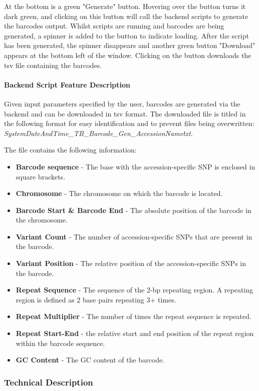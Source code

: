 \documentclass[12pt]{article}
\begin{document}
\begin{itemize}
At the bottom is a green "Generate" button. Hovering over the button turns it dark green, and clicking on this button will call the backend scripts to generate the barcodes output. Whilst scripts are running and barcodes are being generated, a spinner is added to the button to indicate loading. After the script has been generated, the spinner disappears and another green button "Download" appears at the bottom left of the window. Clicking on the button downloads the tsv file containing the barcodes.  

\paragraph{Backend Script Feature Description}
Given input parameters specified by the user, barcodes are generated via the backend and can be downloaded in tsv format. The downloaded file is titled in the following format for easy identification and to prevent files being overwritten: \textit{SystemDateAndTime\_TB\_Barcode\_Gen\_AccessionName\.txt}.

The file contains the following information: 
\begin{itemize}
    \item \textbf{Barcode sequence} - The base with the accession-specific SNP is enclosed in square brackets.
    \item \textbf{Chromosome} - The chromosome on which the barcode is located.
    \item \textbf{Barcode Start \& Barcode End} - The absolute position of the barcode in the chromosome.
    \item \textbf{Variant Count} - The number of accession-specific SNPs that are present in the barcode.
    \item \textbf{Variant Position} - The relative position of the accession-specific SNPs in the barcode. 
    \item \textbf{Repeat Sequence} - The sequence of the 2-bp repeating region. A repeating region is defined as 2 base pairs repeating 3+ times. 
    \item \textbf{Repeat Multiplier} - The number of times the repeat sequence is repeated.
    \item \textbf{Repeat Start-End} - the relative start and end position of the repeat region within the barcode sequence. 
    \item \textbf{GC Content} - The GC content of the barcode. 
\end{itemize}


\subsubsection{Technical Description}



\end{itemize}
\end{document}
